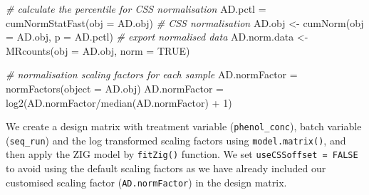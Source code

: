 \documentclass[
]{book}
\newenvironment{Shaded}{\begin{snugshade}}{\end{snugshade}}
\newcommand{\AttributeTok}[1]{\textcolor[rgb]{0.77,0.63,0.00}{#1}}
\newcommand{\CommentTok}[1]{\textcolor[rgb]{0.56,0.35,0.01}{\textit{#1}}}
\newcommand{\ConstantTok}[1]{\textcolor[rgb]{0.00,0.00,0.00}{#1}}
\newcommand{\DecValTok}[1]{\textcolor[rgb]{0.00,0.00,0.81}{#1}}
\newcommand{\FunctionTok}[1]{\textcolor[rgb]{0.00,0.00,0.00}{#1}}
\newcommand{\NormalTok}[1]{#1}
\newcommand{\OtherTok}[1]{\textcolor[rgb]{0.56,0.35,0.01}{#1}}
\newcommand{\SpecialCharTok}[1]{\textcolor[rgb]{0.00,0.00,0.00}{#1}}
\begin{document}
\begin{Shaded}
\begin{Highlighting}[]
\CommentTok{\# calculate the percentile for CSS normalisation}
\NormalTok{AD.pctl }\OtherTok{=} \FunctionTok{cumNormStatFast}\NormalTok{(}\AttributeTok{obj =}\NormalTok{ AD.obj)}
\CommentTok{\# CSS normalisation}
\NormalTok{AD.obj }\OtherTok{\textless{}{-}} \FunctionTok{cumNorm}\NormalTok{(}\AttributeTok{obj =}\NormalTok{ AD.obj, }\AttributeTok{p =}\NormalTok{ AD.pctl)}
\CommentTok{\# export normalised data}
\NormalTok{AD.norm.data }\OtherTok{\textless{}{-}} \FunctionTok{MRcounts}\NormalTok{(}\AttributeTok{obj =}\NormalTok{ AD.obj, }\AttributeTok{norm =} \ConstantTok{TRUE}\NormalTok{)}

\CommentTok{\# normalisation scaling factors for each sample }
\NormalTok{AD.normFactor }\OtherTok{=} \FunctionTok{normFactors}\NormalTok{(}\AttributeTok{object =}\NormalTok{ AD.obj)}
\NormalTok{AD.normFactor }\OtherTok{=} \FunctionTok{log2}\NormalTok{(AD.normFactor}\SpecialCharTok{/}\FunctionTok{median}\NormalTok{(AD.normFactor) }\SpecialCharTok{+} \DecValTok{1}\NormalTok{)}
\end{Highlighting}
\end{Shaded}

We create a design matrix with treatment variable (\texttt{phenol\_conc}), batch variable (\texttt{seq\_run}) and the log transformed scaling factors using \texttt{model.matrix()}, and then apply the ZIG model by \texttt{fitZig()} function. We set \texttt{useCSSoffset\ =\ FALSE} to avoid using the default scaling factors as we have already included our customised scaling factor (\texttt{AD.normFactor}) in the design matrix.

\begin{Shaded}
\end{Shaded}
\end{document}
